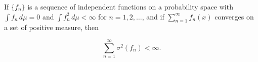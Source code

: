 If $\{f_n\}$ is a sequence of independent functions on a probability space with $\int f_n \, d\mu = 0$ and $\int f_n^2 \, d\mu < \infty$ for $n = 1, 2, \dots$, and if $\sum_{n=1}^{\infty} f_n(x)$ converges on a set of positive measure, then

$$\sum_{n=1}^{\infty} \sigma^2(f_n) < \infty.$$
